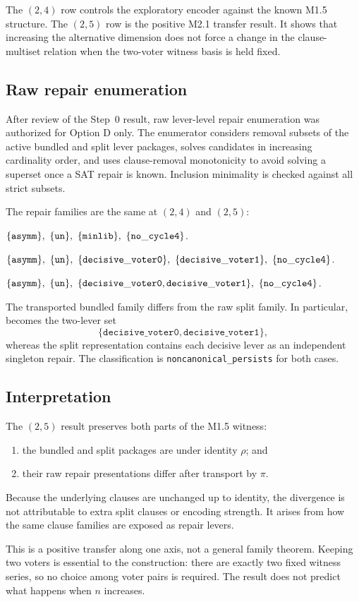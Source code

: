 The $(2,4)$ row controls the exploratory encoder against the known M1.5
structure.  The $(2,5)$ row is the positive M2.1 transfer result.  It shows that
increasing the alternative dimension does not force a change in the
clause-multiset relation when the two-voter witness basis is held fixed.

\subsection{Raw repair enumeration}

After review of the Step~0 result, raw lever-level repair enumeration was
authorized for Option D only.  The enumerator considers removal subsets of the
active bundled and split lever packages, solves candidates in increasing
cardinality order, and uses clause-removal monotonicity to avoid solving a
superset once a SAT repair is known.  Inclusion minimality is checked against
all strict subsets.

The repair families are the same at $(2,4)$ and $(2,5)$:
\begin{description}[style=nextline,leftmargin=2.2em]
  \item[Bundled.]
  $\lever{asymm},\ \lever{un},\ \lever{minlib},\
    \lever{no\_cycle4}$.
  \item[Split.]
  $\{\mathtt{asymm}\},\ \{\mathtt{un}\},\
    \{\mathtt{decisive\_voter0}\},\
    \{\mathtt{decisive\_voter1}\},\
    \{\mathtt{no\_cycle4}\}$.
  \item[Transported bundled.]
  $\{\mathtt{asymm}\},\ \{\mathtt{un}\},\
    \{\mathtt{decisive\_voter0},\mathtt{decisive\_voter1}\},\
    \{\mathtt{no\_cycle4}\}$.
\end{description}

The transported bundled family differs from the raw split family.  In
particular, \lever{minlib} becomes the two-lever set
\[
  \{\mathtt{decisive\_voter0},\mathtt{decisive\_voter1}\},
\]
whereas the split representation contains each decisive lever as an independent
singleton repair.  The classification is
\texttt{noncanonical\_persists} for both cases.

\subsection{Interpretation}

The $(2,5)$ result preserves both parts of the M1.5 witness:
\begin{enumerate}
  \item the bundled and split packages are \CM{} under identity $\rho$; and
  \item their raw repair presentations differ after transport by $\pi$.
\end{enumerate}
Because the underlying clauses are unchanged up to identity, the divergence is
not attributable to extra split clauses or encoding strength.  It arises from
how the same clause families are exposed as repair levers.

This is a positive transfer along one axis, not a general family theorem.
Keeping two voters is essential to the construction: there are exactly two
fixed witness series, so no choice among voter pairs is required.  The result
does not predict what happens when $n$ increases.
